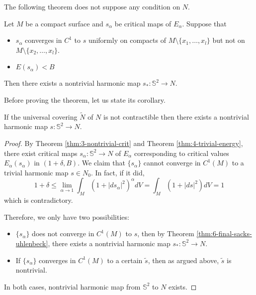 The following theorem does not suppose any condition on \(N\).

\begin{theorem}
\label{thm:6-final-sacks-uhlenbeck}
Let \(M\) be a compact surface and \(s_\alpha\) be critical maps of \(E_\alpha\). Suppose that
\begin{itemize}
\item \(s_\alpha\) converges in \(C^1\) to \(s\) uniformly on compacts of \(M\setminus\{x_1,\dots,x_l\}\) but not on \(M\setminus\{x_2,\dots,x_l\}\).
\item \(E(s_\alpha) < B\)
\end{itemize}
Then there exists a nontrivial harmonic map \(s_*: \mathbb{S}^2 \longrightarrow N\).
\end{theorem}

Before proving the theorem, let us state its corollary.

\begin{corollary}
If the universal covering \(\tilde N\) of \(N\) is not contractible then there exists
a nontrivial harmonic map \(s: \mathbb{S}^2 \longrightarrow N\).
\end{corollary}

\begin{proof}
By Theorem \ref{thm:3-nontrivial-crit} and Theorem \ref{thm:4-trivial-energy}, there exist
critical maps \(s_\alpha: \mathbb{S}^2 \longrightarrow N\) of \(E_\alpha\) corresponding to critical values \(E_\alpha(s_\alpha)\) in \((1+\delta,B)\). We claim that \(\{s_\alpha\}\) cannot converge
in \(C^1(M)\) to a trivial harmonic map \(s\in N_0\). In fact, if it did,
\[
 1+\delta  \leq \lim_{\alpha\to 1} \int_M (1+|ds_\alpha|^2)^\alpha dV = \int_M (1+|ds|^2)dV
= 1
\]
which is contradictory.

Therefore, we only have two possibilities: 
\begin{itemize}
\item \(\{s_\alpha\}\) does not converge in \(C^1(M)\) to \(s\), then by Theorem
\ref{thm:6-final-sacks-uhlenbeck}, there exists a nontrivial harmonic map \(s_*:
  \mathbb{S}^2 \longrightarrow N\).
\item If \(\{s_\alpha\}\) converges in \(C^1(M)\) to a certain \(\tilde s\), then as
argued above, \(\tilde s\) is nontrivial.
\end{itemize}
In both cases, nontrivial harmonic map from \(\mathbb{S}^2\) to \(N\) exists.
\end{proof}

